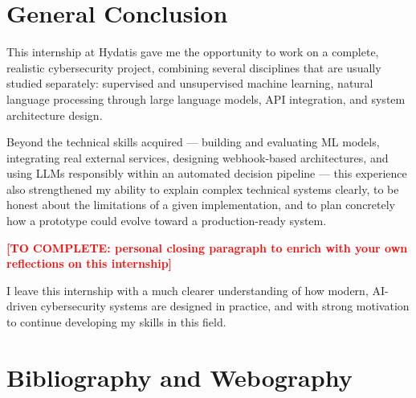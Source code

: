 \documentclass[12pt,a4paper]{report}
\newcommand{\TODO}[1]{\textcolor{red}{\textbf{[TO COMPLETE: #1]}}}
\begin{document}

\chapter*{General Conclusion}

This internship at Hydatis gave me the opportunity to work on a complete, realistic cybersecurity project, combining several disciplines that are usually studied separately: supervised and unsupervised machine learning, natural language processing through large language models, API integration, and system architecture design.

Beyond the technical skills acquired --- building and evaluating ML models, integrating real external services, designing webhook-based architectures, and using LLMs responsibly within an automated decision pipeline --- this experience also strengthened my ability to explain complex technical systems clearly, to be honest about the limitations of a given implementation, and to plan concretely how a prototype could evolve toward a production-ready system.

\TODO{personal closing paragraph to enrich with your own reflections on this internship}

I leave this internship with a much clearer understanding of how modern, AI-driven cybersecurity systems are designed in practice, and with strong motivation to continue developing my skills in this field.


\chapter*{Bibliography and Webography}
\end{document}
